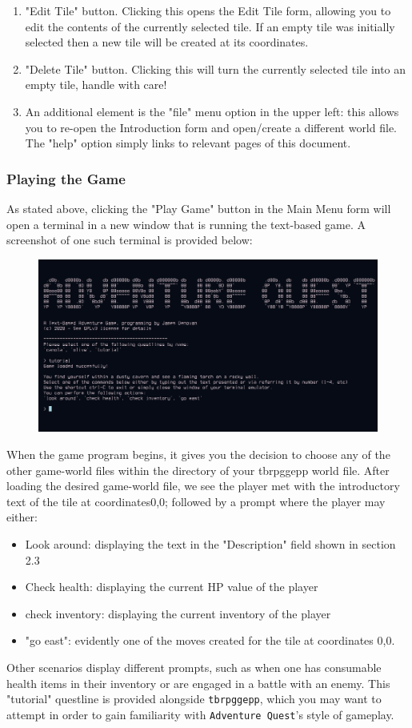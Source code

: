 \documentclass{article} \usepackage[margin=1in,headheight=57pt,headsep=0.1in]{geometry}
\begin{document}
\begin{enumerate}
\begin{itemize}
		\end{itemize}
	\item "Edit Tile" button. Clicking this opens the Edit Tile form, allowing you to edit the contents of the currently selected tile. If an empty tile was initially selected then a new tile will be created at its coordinates.
	\item "Delete Tile" button. Clicking this will turn the currently selected tile into an empty tile, handle with care!
	\item An additional element is the "file" menu option in the upper left: this allows you to re-open the Introduction form and open/create a different world file. The "help" option simply links to relevant pages of this document.
\end{enumerate}
\subsubsection{Playing the Game}
As stated above, clicking the "Play Game" button in the Main Menu form will open a terminal in a new window that is running the text-based game. A screenshot of one such terminal is provided below:
\begin{figure}[H]
	\centering
	\includegraphics[width=1.0\textwidth]{./gameplay.png}
\end{figure}
When the game program begins, it gives you the decision to choose any of the other game-world files within the directory of your tbrpggepp world file. After loading the desired game-world file, we see the player met with the introductory text of the tile at coordinates0,0; followed by a prompt where the player may either:
\begin{itemize}
	\item Look around: displaying the text in the "Description" field shown in section 2.3
	\item Check health: displaying the current HP value of the player
	\item check inventory: displaying the current inventory of the player
	\item "go east": evidently one of the moves created for the tile at coordinates 0,0.
\end{itemize}
Other scenarios display different prompts, such as when one has consumable health items in their inventory or are engaged in a battle with an enemy. This "tutorial" questline is provided alongside \texttt{tbrpggepp}, which you may want to attempt in order to gain familiarity with \texttt{Adventure Quest}'s style of gameplay.
\newpage
\end{document}
